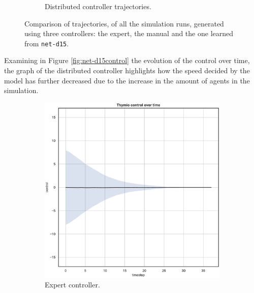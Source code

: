 \begin{figure}[!htb]
\begin{center}
\begin{subfigure}[h]{0.49\textwidth}
			\caption{Distributed controller trajectories.}
		\end{subfigure}
	\end{center}
	\caption[Evaluation of the trajectories learned by 
	\texttt{net-d15}.]{Comparison of trajectories, of all the simulation runs, 
	generated using three controllers: the expert, the manual and the one learned 
	from \texttt{net-d15}.}
	\label{fig:net-d15traj}
\end{figure}

Examining in Figure \ref{fig:net-d15control} the evolution of the control over 
time, the graph of the distributed controller highlights how the speed decided by 
the model has further decreased due to the increase in the amount of agents in 
the simulation.
\begin{figure}[!htb]
	\centering
	\begin{subfigure}[h]{0.3\textwidth}
		\centering
		\includegraphics[width=\textwidth]{contents/images/net-d15/control-overtime-omniscient}%
		\caption{Expert controller.}
	\end{subfigure}
	\hfill
	\begin{subfigure}[h]{0.3\textwidth}
		\centering

\end{subfigure}
\end{figure}
